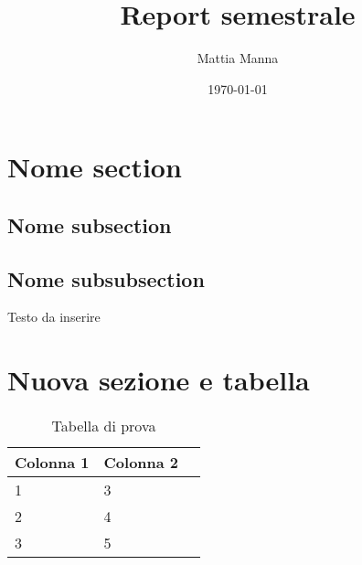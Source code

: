 \documentclass{article}
\title{Report semestrale}
\author{Mattia Manna}
\date{\today}
\begin{document}

 \maketitle 

 \newpage 

  \tableofcontents 

  \newpage 

  \setcounter{page}{1} 
 
                              
 
                              \section{Nome section} 
\subsection{Nome subsection} 
\subsection{Nome subsubsection} 
Testo da inserire

 \newpage 
\section{Nuova sezione e tabella} 



\begin{table}[h!]
\centering
\caption{Tabella di prova} \begin{tabular}{|l|l|l|}
\hline
\textbf{Colonna 1} & \textbf{Colonna 2} \\
\hline
1 & 3 \\
2 & 4 \\
3 & 5 \\
\hline
\end{tabular}
 


\end{table}
\end{document}
